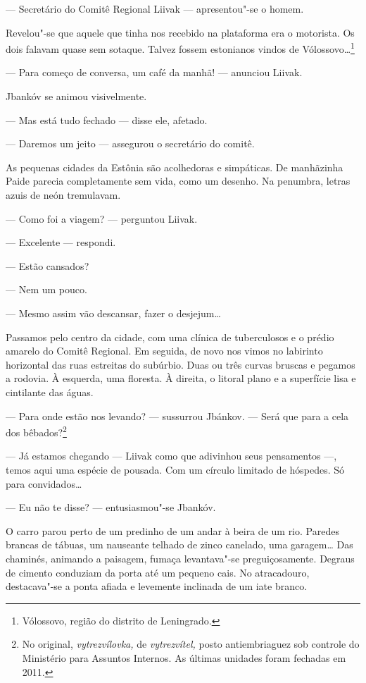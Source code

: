 --- Secretário do Comitê Regional Liivak --- apresentou"-se
o homem.

Revelou"-se que aquele que tinha nos recebido na plataforma era o
motorista. Os dois falavam quase sem sotaque. Talvez fossem estonianos
vindos de Vólossovo\ldots{}\footnote{Vólossovo, região do distrito de
  Leningrado.}

--- Para começo de conversa, um café da manhã! ---
anunciou Liivak.

Jbankóv se animou visivelmente.

--- Mas está tudo fechado --- disse ele, afetado.

--- Daremos um jeito --- assegurou o secretário do comitê.

As pequenas cidades da Estônia são acolhedoras e simpáticas. De
manhãzinha Paide parecia completamente sem vida, como um desenho. Na
penumbra, letras azuis de neón tremulavam.

--- Como foi a viagem? --- perguntou Liivak.

--- Excelente --- respondi.

--- Estão cansados?

--- Nem um pouco.

--- Mesmo assim vão descansar, fazer o desjejum\ldots{}

Passamos pelo centro da cidade, com uma clínica de tuberculosos e o
prédio amarelo do Comitê Regional. Em seguida, de novo nos vimos no
labirinto horizontal das ruas estreitas do subúrbio. Duas ou três curvas
bruscas e pegamos a rodovia. À esquerda, uma floresta. À direita, o
litoral plano e a superfície lisa e cintilante das águas.

--- Para onde estão nos levando? --- sussurrou Jbánkov.
--- Será que para a cela dos bêbados?\footnote{No original,
  \emph{vytrezvílovka,} de \emph{vytrezvítel,} posto antiembriaguez sob
  controle do Ministério para Assuntos Internos. As últimas unidades
  foram fechadas em 2011.}

--- Já estamos chegando --- Liivak como que adivinhou seus
pensamentos ---, temos aqui uma espécie de pousada. Com um
círculo limitado de hóspedes. Só para convidados\ldots{}

--- Eu não te disse? --- entusiasmou"-se Jbankóv.

O carro parou perto de um predinho de um andar à beira de um rio.
Paredes brancas de tábuas, um nauseante telhado de zinco canelado, uma garagem\ldots{}
Das chaminés, animando a paisagem, fumaça levantava"-se preguiçosamente.
Degraus de cimento conduziam da porta até um pequeno cais. No
atracadouro, destacava"-se a ponta afiada e levemente inclinada de um
iate branco.

